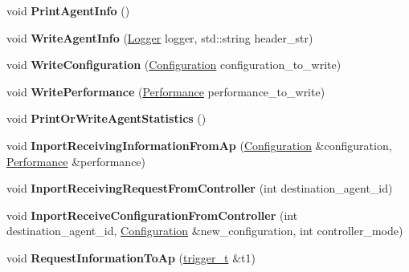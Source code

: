 \begin{DoxyCompactItemize}
void {\bfseries Print\+Agent\+Info} ()
\item 
\mbox{\label{classcompcxx__Agent__25_a90951f40579a12cb4b5584acbf7eedb8}} 
void {\bfseries Write\+Agent\+Info} (\hyperlink{structLogger}{Logger} logger, std\+::string header\+\_\+str)
\item 
\mbox{\label{classcompcxx__Agent__25_a504a6b195024a6533a35954c20e02b61}} 
void {\bfseries Write\+Configuration} (\hyperlink{structConfiguration}{Configuration} configuration\+\_\+to\+\_\+write)
\item 
\mbox{\label{classcompcxx__Agent__25_a628b28322f02142603257b83b860c7de}} 
void {\bfseries Write\+Performance} (\hyperlink{structPerformance}{Performance} performance\+\_\+to\+\_\+write)
\item 
\mbox{\label{classcompcxx__Agent__25_a2816c04a03b20a1d296355d5fe3674f4}} 
void {\bfseries Print\+Or\+Write\+Agent\+Statistics} ()
\item 
\mbox{\label{classcompcxx__Agent__25_ada9e8f711e760739d00ae2cfe3a95c7e}} 
void {\bfseries Inport\+Receiving\+Information\+From\+Ap} (\hyperlink{structConfiguration}{Configuration} \&configuration, \hyperlink{structPerformance}{Performance} \&performance)
\item 
\mbox{\label{classcompcxx__Agent__25_a0304719f509dbc5031e6f718c1b6a7ee}} 
void {\bfseries Inport\+Receiving\+Request\+From\+Controller} (int destination\+\_\+agent\+\_\+id)
\item 
\mbox{\label{classcompcxx__Agent__25_a314c2ae1f9dbbc04232c6b50aa10f836}} 
void {\bfseries Inport\+Receive\+Configuration\+From\+Controller} (int destination\+\_\+agent\+\_\+id, \hyperlink{structConfiguration}{Configuration} \&new\+\_\+configuration, int controller\+\_\+mode)
\item 
\mbox{\label{classcompcxx__Agent__25_a4a7b7f09914ec79562dfa2768a7888a6}} 
void {\bfseries Request\+Information\+To\+Ap} (\hyperlink{classtrigger__t}{trigger\+\_\+t} \&t1)
\end{DoxyCompactItemize}
